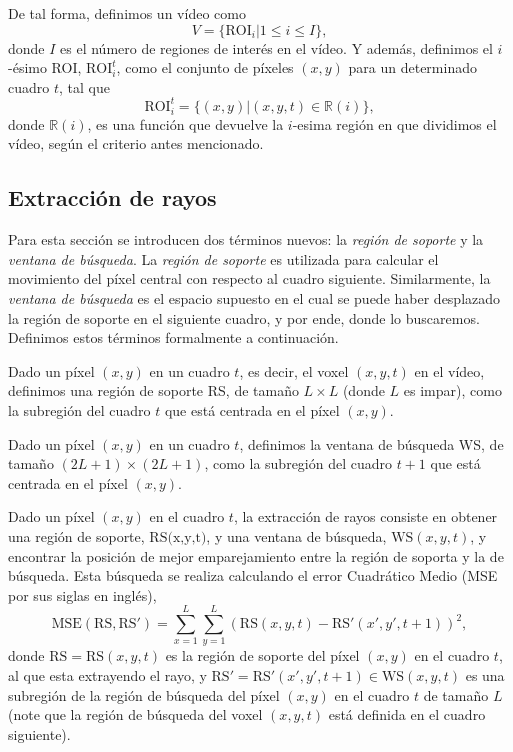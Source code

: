 	De tal forma, definimos un vídeo como 
	\begin{equation}\label{algoritmo:eq:video}		
		V = \{\text{ROI}_i | 1 \leq i \le I\}, 
	\end{equation}
	donde $I$ es el número de regiones de interés en el vídeo. Y además, definimos el $i$-ésimo ROI, $\text{ROI}_i^t$, como el conjunto de píxeles $(x,y)$ para un determinado cuadro $t$, tal que
	\begin{equation}\label{algoritmo:eq:roi}
		\text{ROI}_{i}^{t} = \{(x,y) | (x,y,t) \in \mathds{R}(i)\},
	\end{equation}
	donde $\mathds{R}(i)$, es una función que devuelve la $i$-esima región en que dividimos el vídeo, según el criterio antes mencionado.

	\subsection{Extracción de rayos}
	\label{algoritmo:ext_rayos}
	
	Para esta sección se introducen dos términos nuevos: la \emph{región de soporte} y la \emph{ventana de búsqueda}. La \emph{región de soporte} es utilizada para calcular el movimiento del píxel central con respecto al cuadro siguiente. Similarmente, la \emph{ventana de búsqueda} es el espacio supuesto en el cual se puede haber desplazado la región de soporte en el siguiente cuadro, y por ende, donde lo buscaremos. Definimos estos términos formalmente a continuación.
	
	\begin{definition}	
  Dado un píxel $(x,y)$ en un cuadro $t$, es decir, el voxel $(x,y,t)$ en el vídeo, definimos una región de soporte RS, de tamaño $L \times L$ (donde $L$ es impar), como la subregión del cuadro $t$ que está centrada en el píxel $(x,y)$.
	\end{definition}

	\begin{definition}
	Dado un píxel $(x,y)$ en un cuadro $t$, definimos la ventana de búsqueda WS, de  tamaño $(2L+1) \times (2L+1)$, como la subregión del cuadro $t+1$ que está centrada en el píxel $(x,y)$.
	\end{definition}
		
	Dado un píxel $(x,y)$ en el cuadro $t$, la extracción de rayos consiste en obtener una región de soporte, $\text{RS(x,y,t)}$, y una ventana de búsqueda, $\text{WS}(x,y,t)$, y encontrar la posición de mejor emparejamiento entre la región de soporta y la de búsqueda. Esta búsqueda se realiza calculando el error Cuadrático Medio (MSE por sus siglas en inglés), \begin{equation}\label{algoritmo:eq:mse}	
			\text{MSE}(\text{RS}, \text{RS}') = \sum_{x=1}^{L} \sum_{y=1}^{L} (\text{RS}(x,y,t) - \text{RS}'(x',y',t+1))^2,
		\end{equation} 
	donde $\text{RS} = \text{RS}(x,y,t)$ es la región de soporte del píxel $(x,y)$ en el cuadro $t$, al que esta extrayendo el rayo, y $\text{RS}' = \text{RS}'(x',y',t+1) \in \text{WS}(x,y,t)$ es una subregión de la región de búsqueda del píxel $(x,y)$ en el cuadro $t$ de tamaño $L$ (note que la región de búsqueda del voxel $(x,y,t)$ está definida en el cuadro siguiente).
		
